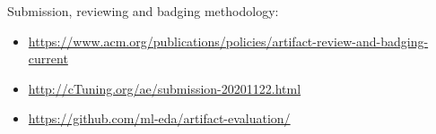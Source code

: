 \documentclass{sigplanconf}
\begin{document}
Submission, reviewing and badging methodology:

\begin{itemize}
  \item \url{https://www.acm.org/publications/policies/artifact-review-and-badging-current}
  \item \url{http://cTuning.org/ae/submission-20201122.html}
  \item \url{https://github.com/ml-eda/artifact-evaluation/}
\end{itemize}

\end{document}
